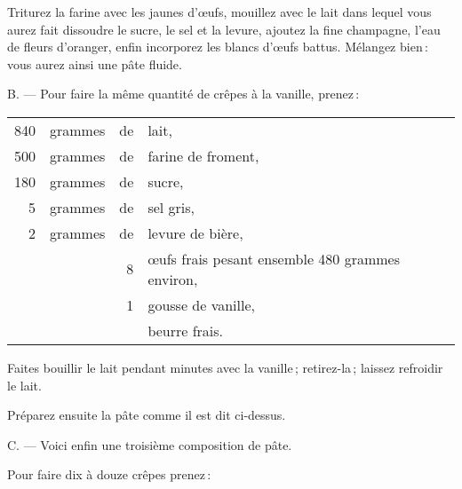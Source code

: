 Triturez la farine avec les jaunes d'œufs, mouillez avec le lait dans lequel
vous aurez fait dissoudre le sucre, le sel et la levure, ajoutez la fine
champagne, l'eau de fleurs d'oranger, enfin incorporez les blancs d'œufs
battus. Mélangez bien : vous aurez ainsi une pâte fluide.

\medskip

B. — Pour faire la même quantité de crêpes à la vanille, prenez :

\footnotesize
\begin{longtable}{rrrp{16em}}
    840 & grammes & de & lait,                                                                            \\
    500 & grammes & de & farine de froment,                                                               \\
    180 & grammes & de & sucre,                                                                           \\
      5 & grammes & de & sel gris,                                                                        \\
      2 & grammes & de & levure de bière,                                                                 \\
        &         &  8 & œufs frais pesant ensemble 480 grammes environ,                                  \\
        &         &  1 & gousse de vanille,                                                               \\
        &         &    & beurre frais.                                                                    \\
\end{longtable}
\normalsize

Faites bouillir le lait pendant {\mmm} minutes avec la vanille ;
retirez-la ; laissez refroidir le lait.

Préparez ensuite la pâte comme il est dit ci-dessus.

\medskip

C. — Voici enfin une troisième composition de pâte.

\medskip

Pour faire dix à douze crêpes prenez :

